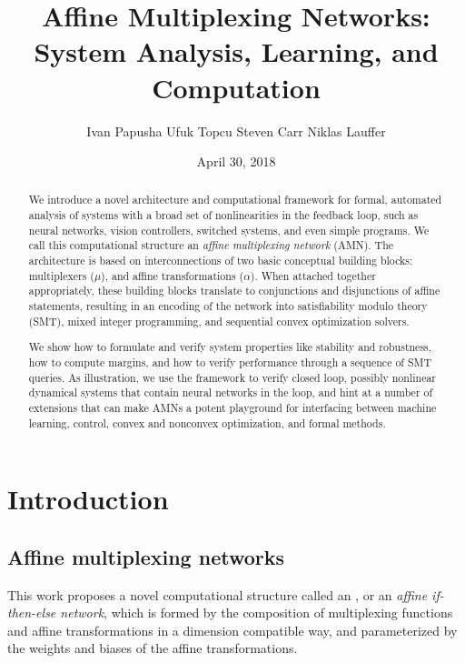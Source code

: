 \documentclass[10pt]{article}
\title{\bf Affine Multiplexing Networks:\\
		System Analysis, Learning, and Computation}
\author{Ivan Papusha \quad Ufuk Topcu \quad Steven Carr \quad Niklas Lauffer}
\date{April 30, 2018}
\newcommand{\amnet}{\textsc{Amnet}}
\theoremstyle{remark}
\theoremstyle{definition}
\theoremstyle{plain}
\begin{document}
\maketitle

\begin{abstract}
We introduce a novel architecture and computational framework for formal,
automated analysis of systems with a broad set of nonlinearities in the
feedback loop, such as neural networks, vision controllers, switched systems,
and even simple programs.  We call this computational structure an \emph{affine
multiplexing network} (AMN).  The architecture is based on interconnections of
two basic conceptual building
blocks: multiplexers ($\mu$), and affine transformations ($\alpha$). 
When attached together appropriately, these building blocks translate
to conjunctions and disjunctions of affine statements, resulting in an encoding
of the network into satisfiability modulo theory (SMT), mixed integer
programming, and sequential convex optimization solvers.

We show how to formulate and verify system properties like stability and
robustness, how to compute margins, and how to verify performance through a
sequence of SMT queries. As illustration, we use the framework to verify
closed loop, possibly nonlinear dynamical systems that contain neural networks
in the loop, and hint at a number of extensions that can make AMNs a potent
playground for interfacing between machine learning, control, convex and
nonconvex optimization, and formal methods. 
\end{abstract}

\section{Introduction}\label{sec:introduction}

\subsection{Affine multiplexing networks}
This work proposes a novel computational structure called an
, or an \emph{affine if-then-else network}, which is formed by the
composition of multiplexing functions and affine transformations in a dimension
compatible way, and parameterized by the weights and biases of the affine
transformations.  
\end{document}
